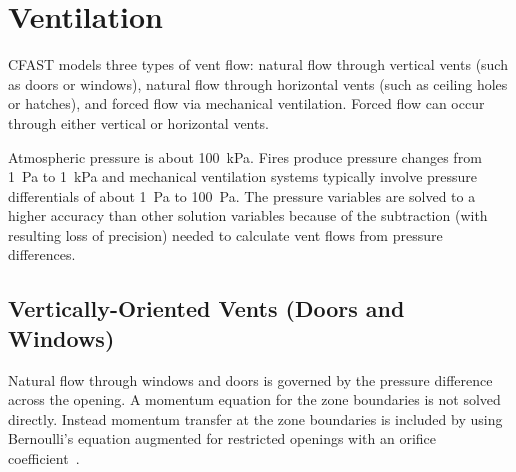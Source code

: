 \chapter{Ventilation}

CFAST models three types of vent flow: natural flow through vertical vents (such as doors or windows),  natural flow through horizontal vents (such as ceiling holes or hatches), and forced flow via mechanical ventilation. Forced flow can occur through either vertical or horizontal vents. 

Atmospheric pressure is about 100~kPa. Fires produce pressure changes from 1~Pa to 1~kPa and mechanical ventilation systems typically involve pressure differentials of about 1~Pa to 100~Pa.  The pressure variables are solved to a higher accuracy than other solution variables because of the subtraction (with resulting loss of precision) needed to calculate vent flows from pressure differences.


\section{Vertically-Oriented Vents (Doors and Windows)}

Natural flow through windows and doors is governed by the pressure difference across the opening.  A momentum equation for the zone boundaries is not solved directly.  Instead momentum transfer at the zone boundaries is included by using Bernoulli's equation augmented for restricted openings with an orifice coefficient~\cite{Quintiere:1984, Steckler_Coefficients}.  

